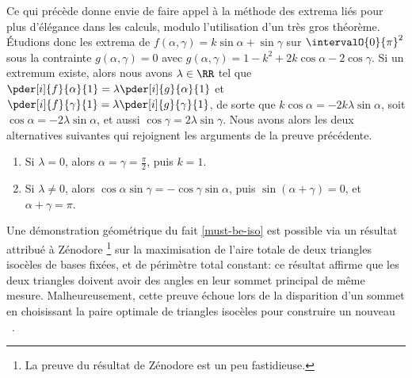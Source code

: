 \begin{remark}
    Ce qui précède donne envie de faire appel à la méthode des extrema liés pour plus d'élégance dans les calculs, modulo l'utilisation d'un très gros théorème.
    Étudions donc les extrema de
	$f(\alpha , \gamma) = k \sin \alpha + \sin \gamma$
	sur $\intervalO{0}{\pi}^2$ sous la contrainte
	$g(\alpha , \gamma) = 0$
	avec
	$g(\alpha , \gamma) = 1 - k^2 + 2 k \cos \alpha - 2 \cos \gamma$.
    Si un extremum existe, alors nous avons $\lambda \in \RR$ tel que
    $\pder[i]{f}{\alpha}{1} = \lambda \pder[i]{g}{\alpha}{1}$
	et
    $\pder[i]{f}{\gamma}{1} = \lambda \pder[i]{g}{\gamma}{1}$,
	de sorte que
	$k \cos \alpha = - 2 k \lambda \sin \alpha$,
	soit
	$\cos \alpha = - 2 \lambda \sin \alpha$,
	et aussi
	$\cos \gamma = 2 \lambda \sin \gamma$.
	Nous avons alors les deux alternatives suivantes qui rejoignent les arguments de la preuve précédente.
	\begin{enumerate}
	    \item Si $\lambda = 0$,
	    alors
	    $\alpha = \gamma = \frac{\pi}{2}$, puis $k = 1$. 

	    \item Si $\lambda \neq 0$,
	    alors
	    $\cos \alpha \sin \gamma = - \cos \gamma \sin \alpha$,
	    puis
	    $\sin (\alpha + \gamma) = 0$,
	    et
	    $\alpha + \gamma = \pi$.
	\end{enumerate}
\end{remark}


%    


\begin{remark}
	Une démonstration géométrique du fait \ref{must-be-iso} est possible via un résultat attribué à Zénodore%
	\footnote{
	    La preuve du résultat de Zénodore est un peu fastidieuse.
	}
	sur la maximisation de l'aire totale de deux triangles isocèles de bases fixées, et de périmètre total constant:
	ce résultat affirme que les deux triangles doivent avoir des angles en leur sommet principal de même mesure.
	Malheureusement, cette preuve échoue lors de la disparition d'un sommet en choisissant la paire optimale de triangles isocèles pour construire un nouveau \ngone\ .
\end{remark}




